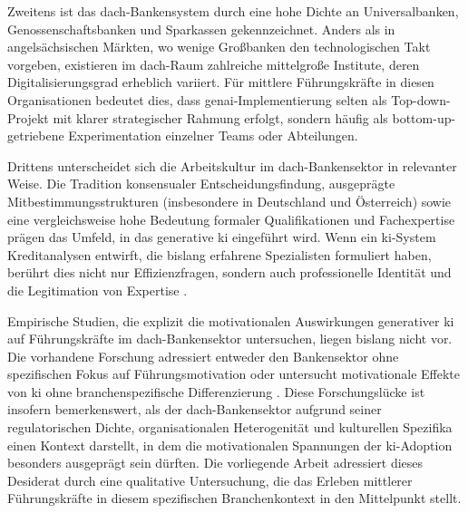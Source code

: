 Zweitens ist das \acrshort{dach}-Bankensystem durch eine hohe Dichte an Universalbanken, Genossenschaftsbanken und Sparkassen gekennzeichnet. Anders als in angelsächsischen Märkten, wo wenige Großbanken den technologischen Takt vorgeben, existieren im \acrshort{dach}-Raum zahlreiche mittelgroße Institute, deren Digitalisierungsgrad erheblich variiert. Für mittlere Führungskräfte in diesen Organisationen bedeutet dies, dass \acrshort{genai}-Implementierung selten als Top-down-Projekt mit klarer strategischer Rahmung erfolgt, sondern häufig als bottom-up-getriebene Experimentation einzelner Teams oder Abteilungen.

Drittens unterscheidet sich die Arbeitskultur im \acrshort{dach}-Bankensektor in relevanter Weise. Die Tradition konsensualer Entscheidungsfindung, ausgeprägte Mitbestimmungsstrukturen (insbesondere in Deutschland und Österreich) sowie eine vergleichsweise hohe Bedeutung formaler Qualifikationen und Fachexpertise prägen das Umfeld, in das generative \gls{ki} eingeführt wird. Wenn ein \acrshort{ki}-System Kreditanalysen entwirft, die bislang erfahrene Spezialisten formuliert haben, berührt dies nicht nur Effizienzfragen, sondern auch professionelle Identität und die Legitimation von Expertise \parencite{quaquebekeNowNewNext2023}.

Empirische Studien, die explizit die motivationalen Auswirkungen generativer \gls{ki} auf Führungskräfte im \acrshort{dach}-Bankensektor untersuchen, liegen bislang nicht vor. Die vorhandene Forschung adressiert entweder den Bankensektor ohne spezifischen Fokus auf Führungsmotivation \parencite{bankinsMultilevelReviewArtificial2024} oder untersucht motivationale Effekte von \gls{ki} ohne branchenspezifische Differenzierung \parencite{brynjolfssonGenerativeAIWork2025, edwardsManagerialControlFeedback2024}. Diese Forschungslücke ist insofern bemerkenswert, als der \acrshort{dach}-Bankensektor aufgrund seiner regulatorischen Dichte, organisationalen Heterogenität und kulturellen Spezifika einen Kontext darstellt, in dem die motivationalen Spannungen der \acrshort{ki}-Adoption besonders ausgeprägt sein dürften. Die vorliegende Arbeit adressiert dieses Desiderat durch eine qualitative Untersuchung, die das Erleben mittlerer Führungskräfte in diesem spezifischen Branchenkontext in den Mittelpunkt stellt.
